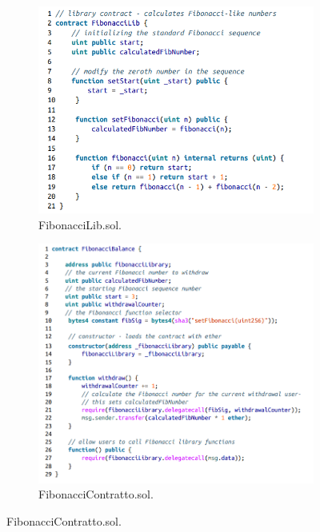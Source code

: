 \begin{figure}[H]
      \centering
      \begin{subfigure}[b]{.5\textwidth}
            \centering
            \includegraphics[width=\linewidth, keepaspectratio]{capitoli/ethereum/imgs/delegate_lib.png}
            \caption{FibonacciLib.sol.}
      \end{subfigure}%
      \begin{subfigure}[b]{.5\textwidth}
            \centering
            \includegraphics[width=\linewidth, keepaspectratio]{capitoli/ethereum/imgs/delegate_contratto.png}
            \caption{FibonacciContratto.sol.}
      \end{subfigure}
\end{figure}


